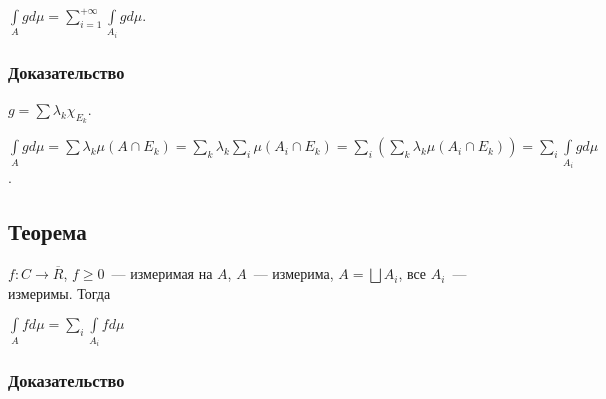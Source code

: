 \documentclass{article}
\begin{document}
            $\int\limits_{A} g d \mu = \sum\limits_{i = 1}^{+\infty} \int\limits_{A_i} g d \mu$.
            
            \subsubsection{Доказательство}
        
                $g = \sum \lambda_k \chi_{E_k}$.
            
                $\int\limits_A g d \mu = \sum \lambda_k \mu (A \cap E_k) = \sum\limits_{k} \lambda_k \sum\limits_{i} \mu (A_i \cap E_k) = \sum\limits_i \left( \sum\limits_k \lambda_k \mu (A_i \cap E_k ) \right) = \sum\limits_i \int\limits_{A_i} g d \mu$.
            
        \subsection{Теорема}
    
            $f : C \rightarrow \overline{R}$, $f \geqslant 0$~--- измеримая на $A$, $A$~--- измерима, $A = \bigsqcup A_i$, все $A_i$~--- измеримы. Тогда
        
            $\int\limits_{A} f d \mu = \sum\limits_{i} \int\limits_{A_i} f d \mu$
            
            \subsubsection{Доказательство}
        
\end{document}
